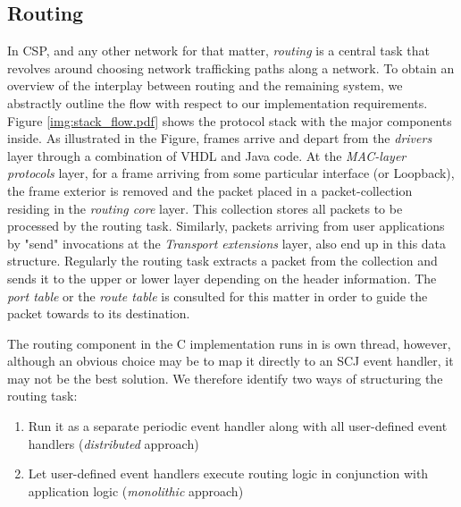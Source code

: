 \subsection{Routing}
In CSP, and any other network for that matter, \textit{routing} is a central task that revolves around choosing network trafficking paths along a network. To obtain an overview of the interplay between routing and the remaining system, we abstractly outline the flow with respect to our implementation requirements. Figure \ref{img:stack_flow.pdf} shows the protocol stack with the major components inside. As illustrated in the Figure, frames arrive and depart from the \textit{drivers} layer through a combination of VHDL and Java code. At the \textit{MAC-layer protocols} layer, for a frame arriving from some particular interface (\iic or Loopback), the frame exterior is removed and the packet placed in a packet-collection residing in the \textit{routing core} layer. This collection stores all packets to be processed by the routing task. Similarly, packets arriving from user applications by "send" invocations at the \textit{Transport extensions} layer, also end up in this data structure. Regularly the routing task extracts a packet from the collection and sends it to the upper or lower layer depending on the header information. The \textit{port table} or the \textit{route table} is consulted for this matter in order to guide the packet towards to its destination.

The routing component in the C implementation runs in is own thread, however, although an obvious choice may be to map it directly to an SCJ event handler, it may not be the best solution. We therefore identify two ways of structuring the routing task:

\begin{enumerate}
	\item Run it as a separate periodic event handler along with all user-defined event handlers (\textit{distributed} approach)
	\item Let user-defined event handlers execute routing logic in conjunction with application logic (\textit{monolithic} approach)
\end{enumerate}

